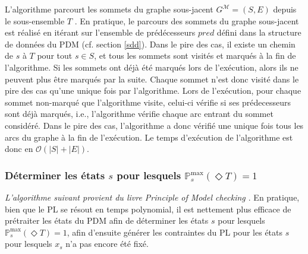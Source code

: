 \documentclass[12pt,a4paper]{report}
\theoremstyle{definition}%
\theoremstyle{remark}
\newcommand{\pr}{\mathbb{P}}
\begin{document}
L'algorithme parcourt les sommets du graphe sous-jacent $G^\mathcal{M} = (S, E)$
depuis le sous-ensemble $T$
. En pratique, le parcours des sommets du graphe sous-jacent est réalisé en itérant sur
l'ensemble de prédécesseurs $pred$ défini dans la structure de données du PDM (cf. section \ref{sdd}). Dans le pire des cas, il existe un chemin de $s$ à $T$ pour tout $s \in S$, et
tous les sommets sont visités et marqués à la fin de l'algorithme.
Si les sommets ont déjà été marqués lors de l'exécution, alors ils ne peuvent plus être marqués par
la suite. Chaque sommet n'est donc visité dans le pire des cas qu'une unique fois par l'algorithme.
Lors de l'exécution, pour chaque sommet non-marqué que l'algorithme visite, celui-ci  vérifie si ses
prédecesseurs sont déjà marqués, i.e., l'algorithme vérifie chaque arc entrant du sommet considéré. Dans le pire des cas, l'algorithme a donc vérifié une unique fois tous les arcs du graphe à la fin de l'exécution.
Le temps d'exécution de l'algorithme est donc en $\mathcal{O}(|S| + |E|)$.

\subsubsection*{Déterminer les états $s$ pour lesquels $\pr^{\max}_s (\Diamond T) = 1$}
\textit{L'algorithme suivant provient du livre Principle of
Model checking \cite{DBLP:books/daglib/0020348}}. En pratique, bien que le PL
se résout en temps polynomial, il est nettement plus efficace de prétraiter
les états du PDM afin de déterminer les états $s$ pour lesquels
$\pr^{\max}_s(\Diamond T) = 1$, afin d'ensuite générer les contraintes du PL
pour les états $s$ pour lesquels $x_s$ n'a pas encore été fixé.
\end{document}
